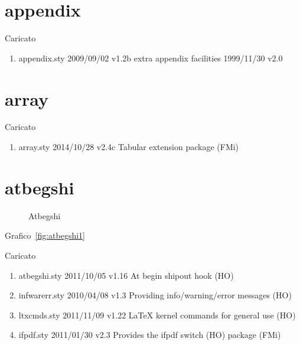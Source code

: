 \section{appendix}

Caricato 
\begin{enumerate}
\item appendix.sty 2009/09/02 v1.2b extra appendix facilities 1999/11/30 v2.0
\end{enumerate}
\section{array}

Caricato 
\begin{enumerate}
\item array.sty 2014/10/28 v2.4c Tabular extension package (FMi)
\end{enumerate}
\section{atbegshi}
\begin{figure}
	\centering
	\caption{Atbegshi}
	\label{fig:atbegshi1}
\end{figure}

Grafico~\vref{fig:atbegshi1}

Caricato 
\begin{enumerate}
\item atbegshi.sty  2011/10/05 v1.16 At begin shipout hook (HO)
\item infwarerr.sty  2010/04/08 v1.3 Providing info/warning/error messages (HO)
\item ltxcmds.sty  2011/11/09 v1.22 LaTeX kernel commands for general use (HO)
\item ifpdf.sty  2011/01/30 v2.3 Provides the ifpdf switch (HO) package (FMi)
\end{enumerate}
